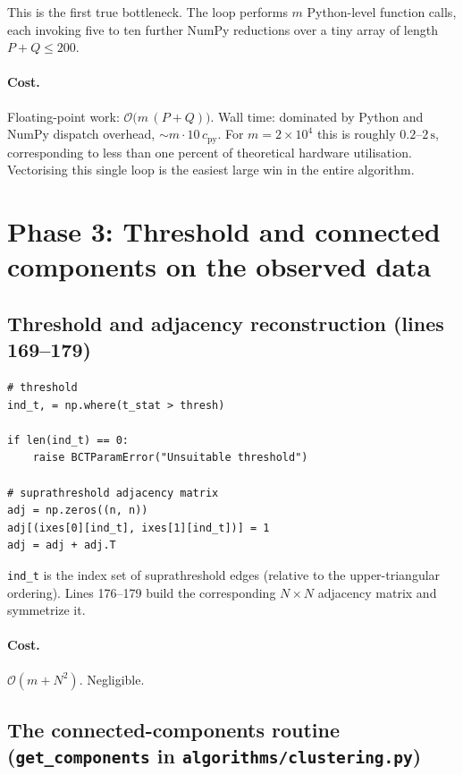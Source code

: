\documentclass[11pt]{article}
\begin{document}
This is the first true bottleneck. The loop performs $m$ Python-level function calls, each invoking five to ten further NumPy reductions over a tiny array of length $P+Q \le 200$.

\paragraph{Cost.} Floating-point work: $\mathcal{O}\bigl(m\,(P+Q)\bigr)$. Wall time: dominated by Python and NumPy dispatch overhead, $\sim m \cdot 10\,c_{\textrm{py}}$. For $m = 2\times10^4$ this is roughly $0.2$--$2\,\mathrm{s}$, corresponding to less than one percent of theoretical hardware utilisation. Vectorising this single loop is the easiest large win in the entire algorithm.

\section{Phase 3: Threshold and connected components on the observed data}

\subsection{Threshold and adjacency reconstruction (lines 169--179)}

\begin{lstlisting}[firstnumber=169]
# threshold
ind_t, = np.where(t_stat > thresh)

if len(ind_t) == 0:
    raise BCTParamError("Unsuitable threshold")

# suprathreshold adjacency matrix
adj = np.zeros((n, n))
adj[(ixes[0][ind_t], ixes[1][ind_t])] = 1
adj = adj + adj.T
\end{lstlisting}

\texttt{ind\_t} is the index set of suprathreshold edges (relative to the upper-triangular ordering). Lines 176--179 build the corresponding $N\times N$ adjacency matrix and symmetrize it.

\paragraph{Cost.} $\mathcal{O}(m + N^2)$. Negligible.

\subsection{The connected-components routine (\texttt{get\_components} in \texttt{algorithms/clustering.py})}
\end{document}
